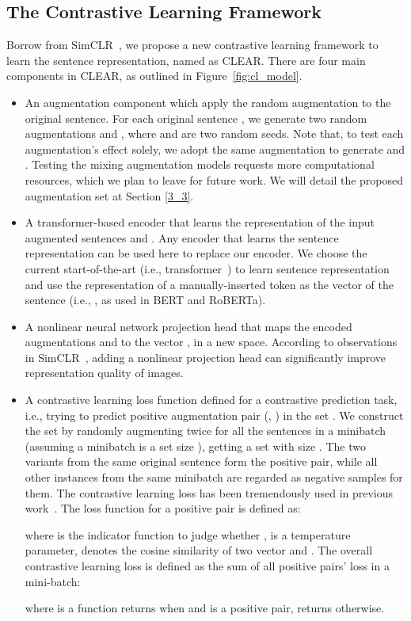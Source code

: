 \documentclass[11pt,a4paper]{article}
\begin{document}
\subsection{The Contrastive Learning Framework} 
\label{3_1}
Borrow from SimCLR~\cite{chen2020simple}, we propose a new contrastive learning framework to learn the sentence representation, named as CLEAR. There are four main components in CLEAR, as outlined in Figure~\ref{fig:cl_model}.
\begin{itemize}
    \item An augmentation component  which apply the random augmentation to the original sentence. For each original sentence , we generate two random augmentations  and , where  and  are two random seeds. 
    Note that, to test each augmentation's effect solely, we adopt the same augmentation to generate  and . Testing the mixing augmentation models requests more computational resources, which we plan to leave for future work.
    We will detail the proposed augmentation set  at Section \ref{3_3}. 
    \item A transformer-based encoder  that learns the representation of the input augmented sentences  and . Any encoder that learns the sentence representation can be used here to replace our encoder. We choose the current start-of-the-art (i.e., transformer~\cite{vaswani2017attention}) to learn sentence representation and use the representation of a manually-inserted token as the vector of the sentence (i.e., , as used in BERT and RoBERTa). 
    \item A nonlinear neural network projection head  that maps the encoded augmentations  and  to the vector ,  in a new space. According to observations in SimCLR~\cite{chen2020simple}, adding a nonlinear projection head can significantly improve representation quality of images.
    \item A contrastive learning loss function defined for a contrastive prediction task, i.e., trying to predict positive augmentation pair (, ) in the set . We construct the set  by randomly augmenting twice for all the sentences in a minibatch (assuming a minibatch is a set  size ), getting a set  with size . The two variants from the same original sentence form the positive pair, while all other instances from the same minibatch are regarded as negative samples for them. The contrastive learning loss has been tremendously used in previous work~\cite{wu2018unsupervised, chen2020simple, giorgi2020declutr, fang2020cert}. The loss function for a positive pair is defined as:
    
    where  is the indicator function to judge whether ,  is a temperature parameter,  denotes the cosine similarity of two vector  and . The overall contrastive learning loss is defined as the sum of all positive pairs' loss in a mini-batch:
    
    where  is a function returns  when  and  is a positive pair, returns  otherwise.  
\end{itemize}
\end{document}
